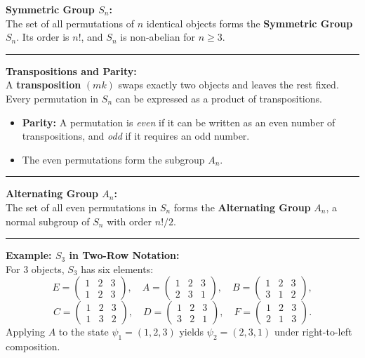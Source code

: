 \documentclass[11pt, a4paper]{report}
\begin{document}
\textbf{Symmetric Group $S_n$:} \\
The set of all permutations of $n$ identical objects forms the \textbf{Symmetric Group} $S_n$. Its order is $n!$, and $S_n$ is non-abelian for $n\ge3$.

\vspace{1em}
\hrule
\vspace{1em}

\textbf{Transpositions and Parity:} \\
A \textbf{transposition} $(mk)$ swaps exactly two objects and leaves the rest fixed. Every permutation in $S_n$ can be expressed as a product of transpositions.
\begin{itemize}
    \item \textbf{Parity:} A permutation is \textit{even} if it can be written as an even number of transpositions, and \textit{odd} if it requires an odd number.
    \item The even permutations form the subgroup $A_n$.
\end{itemize}

\vspace{1em}
\hrule
\vspace{1em}

\textbf{Alternating Group $A_n$:} \\
The set of all even permutations in $S_n$ forms the \textbf{Alternating Group} $A_n$, a normal subgroup of $S_n$ with order $n!/2$.

\vspace{1em}
\hrule
\vspace{1em}

\textbf{Example: $S_3$ in Two-Row Notation:} \\
For $3$ objects, $S_3$ has six elements:
\[ E = \begin{pmatrix} 1 & 2 & 3 \\ 1 & 2 & 3 \end{pmatrix}, \quad A = \begin{pmatrix} 1 & 2 & 3 \\ 2 & 3 & 1 \end{pmatrix}, \quad B = \begin{pmatrix} 1 & 2 & 3 \\ 3 & 1 & 2 \end{pmatrix}, \]
\[ C = \begin{pmatrix} 1 & 2 & 3 \\ 1 & 3 & 2 \end{pmatrix}, \quad D = \begin{pmatrix} 1 & 2 & 3 \\ 3 & 2 & 1 \end{pmatrix}, \quad F = \begin{pmatrix} 1 & 2 & 3 \\ 2 & 1 & 3 \end{pmatrix}. \]
Applying $A$ to the state $\psi_1 = (1, 2, 3)$ yields $\psi_2 = (2, 3, 1)$ under right-to-left composition.
\end{document}
